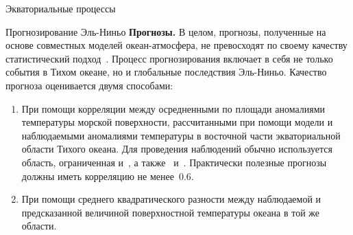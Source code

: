 \begin{chapter}{Экваториальные процессы}
\begin{section}{Прогнозирование Эль-Ниньо}
\textbf{Прогнозы.}%
 В целом, прогнозы, полученные на основе
совместных моделей океан-атмосфера, не превосходят по своему качеству
статистический подход~\cite{Oldenborgh:2005}. Процесс прогнозирования
включает в себя не только события в Тихом океане, но и глобальные последствия
Эль-Ниньо. Качество прогноза оценивается двумя способами:
%
\begin{enumerate}
\item
При помощи корреляции между осредненными по площади аномалиями температуры
морской поверхности,
рассчитанными при помощи модели и наблюдаемыми аномалиями температуры
в восточной части экваториальной области Тихого океана. 
Для проведения наблюдений обычно используется область, ограниченная
 и~, а также~ 
и~. Практически полезные прогнозы должны иметь корреляцию
не менее~$0.6$.
%

\item
При помощи среднего квадратического разности между наблюдаемой и предсказанной
величиной поверхностной температуры океана в той же области.
%
\end{enumerate}


\end{section}
\end{chapter}
